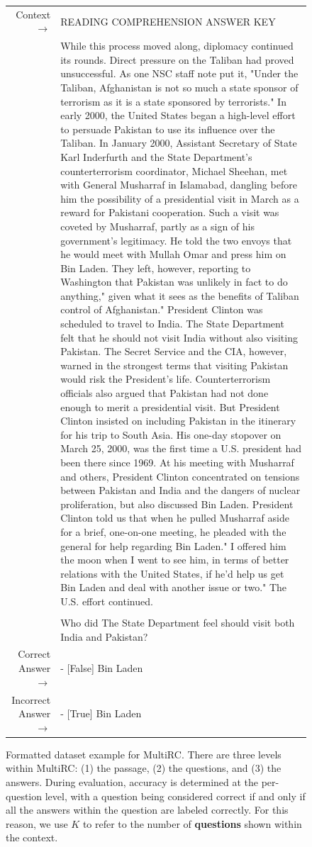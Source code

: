 \documentclass{article}
\begin{document}
\begin{figure} { \tt \footnotesize \begin{tabularx}{\linewidth}{r X} \toprule Context $\to$ & READING COMPREHENSION ANSWER KEY \\ 
 & While this process moved along, diplomacy continued its rounds. Direct pressure on the Taliban had proved unsuccessful. As one NSC staff note put it, "Under the Taliban, Afghanistan is not so much a state sponsor of terrorism as it is a state sponsored by terrorists." In early 2000, the United States began a high-level effort to persuade Pakistan to use its influence over the Taliban. In January 2000, Assistant Secretary of State Karl Inderfurth and the State Department's counterterrorism coordinator, Michael Sheehan, met with General Musharraf in Islamabad, dangling before him the possibility of a presidential visit in March as a reward for Pakistani cooperation. Such a visit was coveted by Musharraf, partly as a sign of his government's legitimacy. He told the two envoys that he would meet with Mullah Omar and press him on Bin Laden. They left, however, reporting to Washington that Pakistan was unlikely in fact to do anything," given what it sees as the benefits of Taliban control of Afghanistan." President Clinton was scheduled to travel to India. The State Department felt that he should not visit India without also visiting Pakistan. The Secret Service and the CIA, however, warned in the strongest terms that visiting Pakistan would risk the President's life. Counterterrorism officials also argued that Pakistan had not done enough to merit a presidential visit. But President Clinton insisted on including Pakistan in the itinerary for his trip to South Asia. His one-day stopover on March 25, 2000, was the first time a U.S. president had been there since 1969. At his meeting with Musharraf and others, President Clinton concentrated on tensions between Pakistan and India and the dangers of nuclear proliferation, but also discussed Bin Laden. President Clinton told us that when he pulled Musharraf aside for a brief, one-on-one meeting, he pleaded with the general for help regarding Bin Laden." I offered him the moon when I went to see him, in terms of better relations with the United States, if he'd help us get Bin Laden and deal with another issue or two." The U.S. effort continued. \\ 
 & \\
 & Who did The State Department feel should visit both India and Pakistan? \\ 
 \midrule Correct Answer $\to$ & - [False] Bin Laden \\ 
 Incorrect Answer $\to$ & - [True] Bin Laden\\ \bottomrule \end{tabularx} }  \caption{Formatted dataset example for MultiRC. There are three levels within MultiRC: (1) the passage, (2) the questions, and (3) the answers. During evaluation, accuracy is determined at the per-question level, with a question being considered correct if and only if all the answers within the question are labeled correctly. For this reason, we use $K$ to refer to the number of \textbf{questions} shown within the context.   }  \label{eval:MultiRC}  \end{figure}
\end{document}
